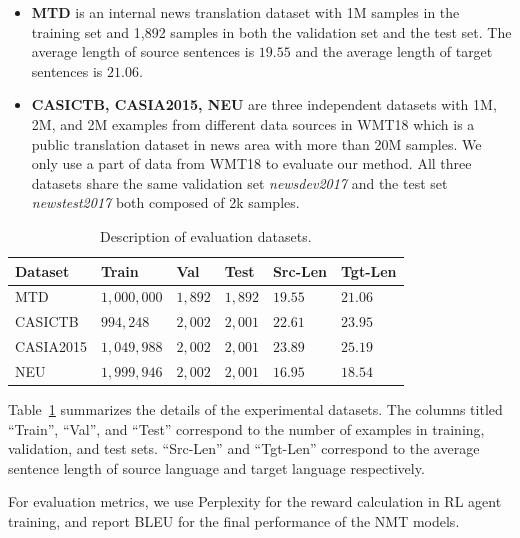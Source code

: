 \documentclass[letterpaper]{article}
\begin{document}
\begin{itemize}
	\item{\textbf{MTD}} is an internal news translation dataset with 1M samples in the training set and 1,892 samples in both the validation set and the test set. The average length of source sentences is $19.55$ and the average length of target sentences is $21.06$.
	\item{\textbf{CASICTB, CASIA2015, NEU}} are three independent datasets with 1M, 2M, and 2M examples from different data sources in WMT18 which is a public translation dataset in news area with more than 20M samples. We only use a part of data from WMT18 to evaluate our method. All three datasets share the same validation set \emph{newsdev2017} and the test set \emph{newstest2017} both composed of 2k samples.
\end{itemize}

\begin{table}[tb]
  \resizebox{\columnwidth}{!}
  {
    \begin{threeparttable}
      \caption{Description of evaluation datasets.}
      \label{tab:datasets}
      \begin{tabular}{llllll}
        \toprule
        Dataset & Train & Val & Test & Src-Len & Tgt-Len\\
        \midrule
        MTD &  $1,000,000$ & $1,892$ & $1,892$ & $19.55$ & $21.06$\\
        CASICTB &  $994,248$ & $2,002$ & $2,001$  & $22.61$ & $23.95$\\
        CASIA2015 &  $1,049,988$ & $2,002$ & $2,001$  & $23.89$ & $25.19$\\
        NEU &  $1,999,946$ & $2,002$ & $2,001$  & $16.95$ & $18.54$\\
        \bottomrule
      \end{tabular}
    \end{threeparttable}
  }
\end{table}

Table~\ref{tab:datasets} summarizes the details of the experimental datasets. The columns titled ``Train'', ``Val'', and ``Test'' correspond to the number of examples in training, validation, and test sets. ``Src-Len'' and ``Tgt-Len'' correspond to the average sentence length of source language and target language respectively.

For evaluation metrics, we use Perplexity for the reward calculation in RL agent training, and report BLEU \cite{papineni2002bleu} for the final performance of the NMT models.
\end{document}

